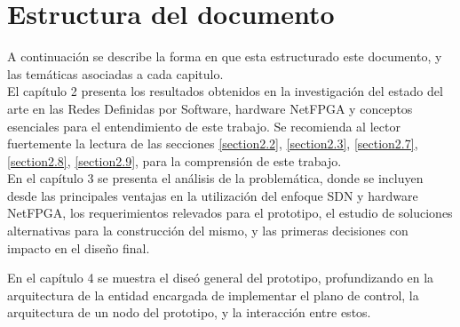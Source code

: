 \section{Estructura del documento}

A continuación se describe la forma en que esta estructurado este documento, y las temáticas asociadas a cada capitulo.\\

El cap\'itulo 2 presenta los resultados obtenidos en la investigación del estado del arte en las Redes Definidas por Software, hardware NetFPGA y conceptos esenciales para el entendimiento de este trabajo. Se recomienda al lector fuertemente la lectura de las secciones \ref{section2.2}, \ref{section2.3}, \ref{section2.7}, \ref{section2.8}, \ref{section2.9}, para la comprensión de este trabajo.\\

En el cap\'itulo 3 se presenta el análisis de la problemática, donde se incluyen desde las principales ventajas en la utilización del enfoque SDN y hardware NetFPGA, los requerimientos relevados para el prototipo, el estudio de soluciones alternativas para la construcción del mismo, y las primeras decisiones con impacto en el diseño final.

En el cap\'itulo 4 se muestra el dise\'o general del prototipo, profundizando en la arquitectura de la entidad encargada de implementar el plano de control, la arquitectura de un nodo del prototipo, y la interacción entre estos.

